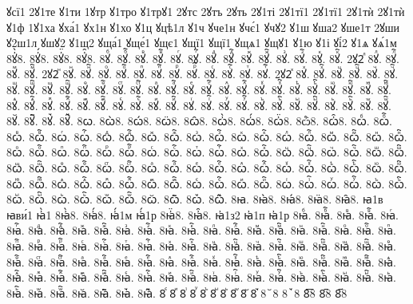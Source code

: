 {ꙋсї1
2ꙋ1те
ꙋ1ти
1ꙋтр
ꙋ1тро
ꙋ1трꙋ1
2ꙋтс
2ꙋтъ
2ꙋть
2ꙋ1ті
2ꙋ1тї1
2ꙋ1тї1
2ꙋ1тѝ
2ꙋ1тѝ
ꙋ1ф
1ꙋ1ха
ꙋха́1
ꙋх1н
ꙋ1хо
ꙋ1ц
ꙋцѣ1л
ꙋ1ч
ꙋче1н
ꙋчє́1
ꙋчꙋ2
ꙋ1ш
ꙋша2
ꙋше1т
2ꙋши
ꙋ2ш1л
ꙋшꙋ2
ꙋ1щ2
ꙋща́1
ꙋще́1
ꙋщє1
ꙋщї1
ꙋщї1
ꙋщѧ1
ꙋщꙋ1
ꙋ1ю
ꙋ1і
ꙋі́2
ꙋ1ѧ
ꙋѧ́1м
8ꙋ҆̀8.
8ꙋ҆́8.
8ꙋ҆̈8.
8ꙋ҆̑8.
8ꙋⷠ.
8ꙋⷠ҇.
8ꙋⷡ.
8ꙋⷡ҇.
8ꙋⷢ.
8ꙋⷢ҇.
8ꙋⷣ.
8ꙋⷣ҇.
8ꙋⷤ.
8ꙋⷤ҇.
8ꙋⷥ.
8ꙋⷥ҇.
8ꙋⷦ.
8ꙋⷦ҇.
2ꙋ2ⷧ
8ꙋⷧ.
8ꙋⷧ҇.
8ꙋⷨ.
8ꙋⷨ҇.
2ꙋ2ⷩ
8ꙋⷩ.
8ꙋⷩ҇.
8ꙋⷪ.
8ꙋⷪ҇.
8ꙋⷫ.
8ꙋⷫ҇.
8ꙋⷬ.
8ꙋⷬ҇.
8ꙋⷭ.
8ꙋⷭ҇.
8ꙋⷮ.
8ꙋⷮ҇.
2ꙋ2ⷯ
8ꙋⷯ.
8ꙋⷯ҇.
8ꙋⷰ.
8ꙋⷰ҇.
8ꙋⷱ.
8ꙋⷱ҇.
8ꙋⷲ.
8ꙋⷲ҇.
8ꙋⷳ.
8ꙋⷳ҇.
8ꙋⷴ.
8ꙋⷴ҇.
8ꙋⷵ.
8ꙋⷵ҇.
8ꙋⷶ.
8ꙋⷶ҇.
8ꙋⷷ.
8ꙋⷷ҇.
8ꙋⷸ.
8ꙋⷸ҇.
8ꙋⷹ.
8ꙋⷹ҇.
8ꙋⷺ.
8ꙋⷺ҇.
8ꙋⷻ.
8ꙋⷻ҇.
8ꙋⷼ.
8ꙋⷼ҇.
8ꙋⷽ.
8ꙋⷽ҇.
8ꙋⷾ.
8ꙋⷾ҇.
8ꙋⷿ.
8ꙋⷿ҇.
8ꙋꙴ.
8ꙋꙴ҇.
8ꙋꙵ.
8ꙋꙵ҇.
8ꙋꙶ.
8ꙋꙶ҇.
8ꙋꙷ.
8ꙋꙷ҇.
8ꙋꙸ.
8ꙋꙸ҇.
8ꙋꙹ.
8ꙋꙹ҇.
8ꙋꙺ.
8ꙋꙺ҇.
8ꙋꙻ.
8ꙋꙻ҇.
8ꙋ꙼.
8ꙋ꙼҇.
8ꙋ꙽.
8ꙋ꙽҇.
8ꙍ.
8ꙍ̀8.
8ꙍ́8.
8ꙍ̈8.
8ꙍ̑8.
8ꙍ҆̀8.
8ꙍ҆́8.
8ꙍ҆̈8.
8ѽ8.
8ꙍ҆̑8.
8ꙍⷠ.
8ꙍⷠ҇.
8ꙍⷡ.
8ꙍⷡ҇.
8ꙍⷢ.
8ꙍⷢ҇.
8ꙍⷣ.
8ꙍⷣ҇.
8ꙍⷤ.
8ꙍⷤ҇.
8ꙍⷥ.
8ꙍⷥ҇.
8ꙍⷦ.
8ꙍⷦ҇.
8ꙍⷧ.
8ꙍⷧ҇.
8ꙍⷨ.
8ꙍⷨ҇.
8ꙍⷩ.
8ꙍⷩ҇.
8ꙍⷪ.
8ꙍⷪ҇.
8ꙍⷫ.
8ꙍⷫ҇.
8ꙍⷬ.
8ꙍⷬ҇.
8ꙍⷭ.
8ꙍⷭ҇.
8ꙍⷮ.
8ꙍⷮ҇.
8ꙍⷯ.
8ꙍⷯ҇.
8ꙍⷰ.
8ꙍⷰ҇.
8ꙍⷱ.
8ꙍⷱ҇.
8ꙍⷲ.
8ꙍⷲ҇.
8ꙍⷳ.
8ꙍⷳ҇.
8ꙍⷴ.
8ꙍⷴ҇.
8ꙍⷵ.
8ꙍⷵ҇.
8ꙍⷶ.
8ꙍⷶ҇.
8ꙍⷷ.
8ꙍⷷ҇.
8ꙍⷸ.
8ꙍⷸ҇.
8ꙍⷹ.
8ꙍⷹ҇.
8ꙍⷺ.
8ꙍⷺ҇.
8ꙍⷻ.
8ꙍⷻ҇.
8ꙍⷼ.
8ꙍⷼ҇.
8ꙍⷽ.
8ꙍⷽ҇.
8ꙍⷾ.
8ꙍⷾ҇.
8ꙍⷿ.
8ꙍⷿ҇.
8ꙍꙴ.
8ꙍꙴ҇.
8ꙍꙵ.
8ꙍꙵ҇.
8ꙍꙶ.
8ꙍꙶ҇.
8ꙍꙷ.
8ꙍꙷ҇.
8ꙍꙸ.
8ꙍꙸ҇.
8ꙍꙹ.
8ꙍꙹ҇.
8ꙍꙺ.
8ꙍꙺ҇.
8ꙍꙻ.
8ꙍꙻ҇.
8ꙍ꙼.
8ꙍ꙼҇.
8ꙍ꙽.
8ꙍ꙽҇.
8ꙗ.
8ꙗ̀8.
8ꙗ́8.
8ꙗ̈8.
8ꙗ̑8.
ꙗ1в
ꙗви́1
ꙗ҆̀1
8ꙗ҆̀8.
8ꙗ҆́8.
ꙗ҆́1м
ꙗ҆́1р
8ꙗ҆̈8.
8ꙗ҆̑8.
ꙗ҆1з2
ꙗ҆1п
ꙗ҆1р
8ꙗⷠ.
8ꙗⷠ҇.
8ꙗⷡ.
8ꙗⷡ҇.
8ꙗⷢ.
8ꙗⷢ҇.
8ꙗⷣ.
8ꙗⷣ҇.
8ꙗⷤ.
8ꙗⷤ҇.
8ꙗⷥ.
8ꙗⷥ҇.
8ꙗⷦ.
8ꙗⷦ҇.
8ꙗⷧ.
8ꙗⷧ҇.
8ꙗⷨ.
8ꙗⷨ҇.
8ꙗⷩ.
8ꙗⷩ҇.
8ꙗⷪ.
8ꙗⷪ҇.
8ꙗⷫ.
8ꙗⷫ҇.
8ꙗⷬ.
8ꙗⷬ҇.
8ꙗⷭ.
8ꙗⷭ҇.
8ꙗⷮ.
8ꙗⷮ҇.
8ꙗⷯ.
8ꙗⷯ҇.
8ꙗⷰ.
8ꙗⷰ҇.
8ꙗⷱ.
8ꙗⷱ҇.
8ꙗⷲ.
8ꙗⷲ҇.
8ꙗⷳ.
8ꙗⷳ҇.
8ꙗⷴ.
8ꙗⷴ҇.
8ꙗⷵ.
8ꙗⷵ҇.
8ꙗⷶ.
8ꙗⷶ҇.
8ꙗⷷ.
8ꙗⷷ҇.
8ꙗⷸ.
8ꙗⷸ҇.
8ꙗⷹ.
8ꙗⷹ҇.
8ꙗⷺ.
8ꙗⷺ҇.
8ꙗⷻ.
8ꙗⷻ҇.
8ꙗⷼ.
8ꙗⷼ҇.
8ꙗⷽ.
8ꙗⷽ҇.
8ꙗⷾ.
8ꙗⷾ҇.
8ꙗⷿ.
8ꙗⷿ҇.
8ꙗꙴ.
8ꙗꙴ҇.
8ꙗꙵ.
8ꙗꙵ҇.
8ꙗꙶ.
8ꙗꙶ҇.
8ꙗꙷ.
8ꙗꙷ҇.
8ꙗꙸ.
8ꙗꙸ҇.
8ꙗꙹ.
8ꙗꙹ҇.
8ꙗꙺ.
8ꙗꙺ҇.
8ꙗꙻ.
8ꙗꙻ҇.
8ꙗ꙼.
8ꙗ꙼҇.
8ꙗ꙽.
8ꙗ꙽҇.
8ꙴ
8ꙵ
8ꙶ
8ꙷ
8ꙸ
8ꙹ
8ꙺ
8ꙻ
8꙼
8꙽
8꙾8
8ꙿ8
8︦8
8︮8
8︯8
}
